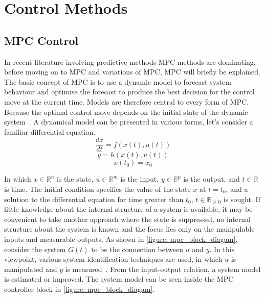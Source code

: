 \chapter{Control Methods}%
\label{chap:appendix_control_methods}

\section{\ac{MPC} Control}
\label{sec:appendix_mpc}
In recent literature involving predictive methods \acf{MPC} methods are dominating, before moving on to \ac{MPC} and variations of \ac{MPC}, \ac{MPC} will briefly be explained.  The basic concept of \ac{MPC} is to use a dynamic model to forecast system behaviour and optimise the forecast to produce the best decision for the control move at the current time. Models are therefore central to every form of \ac{MPC}. Because the optimal control move depends on the initial state of the dynamic system~\cite{rawlings_model_2020}. A dynamical model can be presented in various forms, let's consider a familiar differential equation. 
$$ \frac{dx}{dt} = f(x(t), u(t)) $$
$$ y = h(x(t), u(t)) $$ 
$$ x(t_0) = x_0 $$

In which $x \in \mathbb{R}^n $ is the state, $u \in \mathbb{R}^m$ is the input, $y \in \mathbb{R}^p$ is the output, and $t \in \mathbb{R}$ is time. The initial condition specifies the value of the state $x$ at $t = t_0$, and a solution to the differential equation for time greater than $t_0$, $t \in \mathbb{R}_{\geq 0}$ is sought. If little knowledge about the internal structure of a system is available, it may be convenient to take another approach where the state is suppressed, no internal structure about the system is known and the focus lies only on the manipulable inputs and measurable outputs. As shown in \cref{figure: mpc_block_diagam}, consider the system $G(t)$ to be
the connection between $u$ and $y$. In this viewpoint, various system identification techniques are used, in which $u$ is manipulated and $y$ is measured~\cite{rawlings_model_2020}. From the input-output relation, a system model is estimated or improved. The system model can be seen inside the \ac{MPC} controller block in \cref{figure: mpc_block_diagam}.\\

